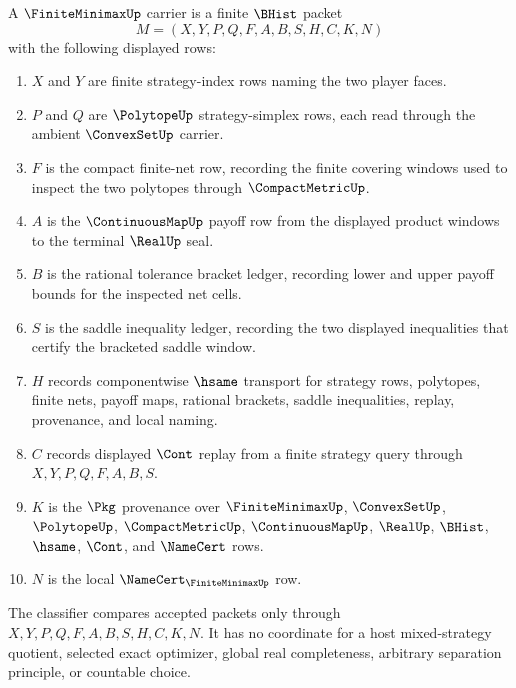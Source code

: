 \begin{definition}
\label{def:finite-minimax-carrier-surface}
A $\FiniteMinimaxUp$ carrier is a finite $\BHist$ packet
$$
M=(X,Y,P,Q,F,A,B,S,H,C,K,N)
$$
with the following displayed rows:
\begin{enumerate}
\item $X$ and $Y$ are finite strategy-index rows naming the two player faces.
\item $P$ and $Q$ are $\PolytopeUp$ strategy-simplex rows, each read through the ambient $\ConvexSetUp$ carrier.
\item $F$ is the compact finite-net row, recording the finite covering windows used to inspect the two polytopes through $\CompactMetricUp$.
\item $A$ is the $\ContinuousMapUp$ payoff row from the displayed product windows to the terminal $\RealUp$ seal.
\item $B$ is the rational tolerance bracket ledger, recording lower and upper payoff bounds for the inspected net cells.
\item $S$ is the saddle inequality ledger, recording the two displayed inequalities that certify the bracketed saddle window.
\item $H$ records componentwise $\hsame$ transport for strategy rows, polytopes, finite nets, payoff maps, rational brackets, saddle inequalities, replay, provenance, and local naming.
\item $C$ records displayed $\Cont$ replay from a finite strategy query through $X,Y,P,Q,F,A,B,S$.
\item $K$ is the $\Pkg$ provenance over $\FiniteMinimaxUp$, $\ConvexSetUp$, $\PolytopeUp$, $\CompactMetricUp$, $\ContinuousMapUp$, $\RealUp$, $\BHist$, $\hsame$, $\Cont$, and $\NameCert$ rows.
\item $N$ is the local $\NameCert_{\FiniteMinimaxUp}$ row.
\end{enumerate}
The classifier compares accepted packets only through $X,Y,P,Q,F,A,B,S,H,C,K,N$. It has no coordinate for a host mixed-strategy quotient, selected exact optimizer, global real completeness, arbitrary separation principle, or countable choice.
\end{definition}

